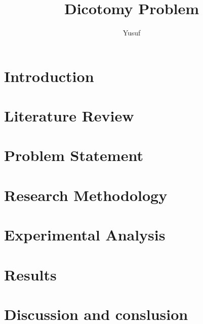 \documentclass[10pt,a4paper]{article}
\author{Yusuf}
\title{Dicotomy Problem}
\begin{document}
\begin{titlepage}
	\maketitle
	\thispagestyle{empty}
\end{titlepage}

\pagebreak

\tableofcontents
{}
\pagebreak

\section{Introduction}


\section{Literature Review} 

\section{Problem Statement} 

\section{Research Methodology}

\section{Experimental Analysis}

\section{Results}

\section{Discussion and conslusion}
\end{document}
